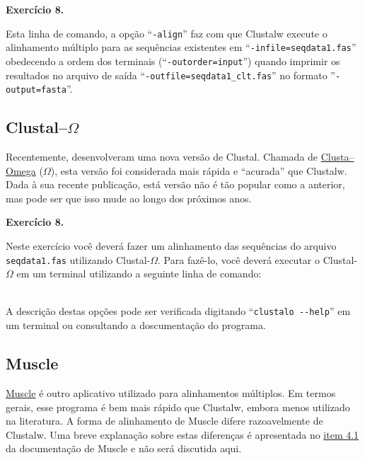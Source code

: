 \begin{refsection}
\begin{blackBlock}{\textbf{Exercício 8.}}
\end{blackBlock}


Esta linha de comando, a opção ``\texttt{-align}'' faz com que Clustalw execute o alinhamento múltiplo para as sequências existentes em ``\texttt{-infile=seqdata1.fas}'' obedecendo a ordem dos terminais (``\texttt{-outorder=input}'') quando imprimir os resultados no arquivo de saída ``\texttt{-outfile=seqdata1\_clt.fas}'' no formato ''\texttt{-output=fasta}''. 



\subsection{Clustal--$\Omega$}\label{tut8:msa:clustalo}

Recentemente, \textcite{Sievers_et_al_2011} desenvolveram uma nova versão de Clustal. Chamada de \href{http://www.clustal.org/omega/}{Clusta--Omega} ($\Omega$), esta versão foi considerada mais rápida e ``acurada'' que Clustalw. Dada à sua recente publicação, está versão não é tão popular como a anterior, mas pode ser que isso mude ao longo dos próximos anos.


\begin{blackBlock}{\textbf{Exercício 8.}}\label{tut8:ex:8.3}

Neste exercício você deverá fazer um alinhamento das sequências do arquivo \texttt{seqdata1.fas} utilizando Clustal-$\Omega$. Para fazê-lo, você deverá executar o Clustal-$\Omega$ em um terminal utilizando a seguinte linha de comando:\\

\scriptsize
{}\\
\normalsize

\end{blackBlock}

A descrição destas opções pode ser verificada digitando ``\texttt{clustalo {-}{-}help}'' em um terminal ou consultando a doscumentação do programa.


\subsection{Muscle}\label{tut8:msa:muscle}

\href{http://www.drive5.com/muscle/}{Muscle} \parencite{Edgar_2004} é outro aplicativo utilizado para alinhamentos múltiplos. Em termos gerais, esse programa é bem mais rápido que Clustalw, embora menos utilizado na literatura. A forma de alinhamento de Muscle difere razoavelmente de Clustalw. Uma breve explanação sobre estas diferenças é apresentada no \href{http://www.drive5.com/muscle/muscle.html#_Toc81224846}{item 4.1} da documentação de Muscle e não será discutida aqui.\\


\end{refsection}
